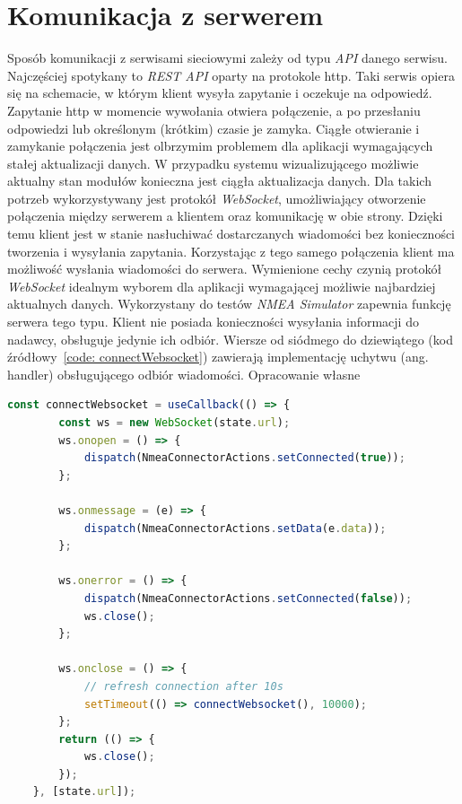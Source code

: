 \documentclass[skorowidz,skroty]{dyplomWEZUT}
\begin{document}
\section{Komunikacja z serwerem}\label{sec: server communication} 
Sposób komunikacji z serwisami sieciowymi zależy od typu \textit{API} danego serwisu. Najczęściej spotykany to \textit{REST API} oparty na protokole http. Taki serwis opiera się na schemacie, w którym klient wysyła zapytanie i oczekuje na odpowiedź. Zapytanie http w momencie wywołania otwiera połączenie, a po przesłaniu odpowiedzi lub określonym (krótkim) czasie je zamyka. Ciągłe otwieranie i zamykanie połączenia jest olbrzymim problemem dla aplikacji wymagających stałej aktualizacji danych. W przypadku systemu wizualizującego możliwie aktualny stan modułów konieczna jest ciągła aktualizacja danych. Dla takich potrzeb wykorzystywany jest protokół \textit{WebSocket}, umożliwiający otworzenie połączenia między serwerem a klientem oraz komunikację w obie strony. Dzięki temu klient jest w stanie nasłuchiwać dostarczanych wiadomości bez konieczności tworzenia i wysyłania zapytania. Korzystając z tego samego połączenia klient ma możliwość wysłania wiadomości do serwera. Wymienione cechy czynią protokół \textit{WebSocket} idealnym wyborem dla aplikacji wymagającej możliwie najbardziej aktualnych danych. Wykorzystany do testów \textit{NMEA Simulator} zapewnia funkcję serwera tego typu. Klient nie posiada konieczności wysyłania informacji do nadawcy, obsługuje jedynie ich odbiór. Wiersze od siódmego do dziewiątego (kod źródłowy~\ref{code: connectWebsocket}) zawierają implementację uchytwu (ang. handler) obsługującego odbiór wiadomości.
{Opracowanie własne}{\label{code: connectWebsocket}}
\begin{lstlisting}[language=JavaScript]
  const connectWebsocket = useCallback(() => {
        const ws = new WebSocket(state.url);
        ws.onopen = () => {
            dispatch(NmeaConnectorActions.setConnected(true));
        };

        ws.onmessage = (e) => {
            dispatch(NmeaConnectorActions.setData(e.data));
        };

        ws.onerror = () => {
            dispatch(NmeaConnectorActions.setConnected(false));
            ws.close();
        };

        ws.onclose = () => {
            // refresh connection after 10s
            setTimeout(() => connectWebsocket(), 10000);
        };
        return (() => {
            ws.close();
        });
    }, [state.url]);    
    
\end{lstlisting}
\end{document}
